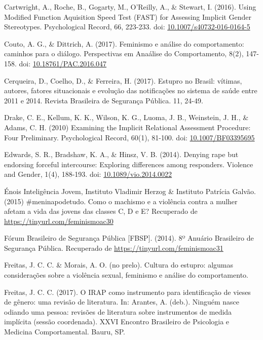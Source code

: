 \hangindent=25pt
\noindent Cartwright, A., Roche, B., Gogarty, M., O'Reilly, A., \& Stewart, I. (2016). Using Modified Function Aquisition Speed Test (FAST) for Assessing Implicit Gender Stereotypes. Psychological Record, 66, 223-233. doi: \url{10.1007/s40732-016-0164-5}

\hangindent=25pt
\noindent Couto, A. G., \& Dittrich, A. (2017). Feminismo e análise do comportamento: caminhos para o diálogo. Perspectivas em Anaálise do Comportamento, 8(2), 147-158. doi: \url{10.18761/PAC.2016.047}

\hangindent=25pt
\noindent Cerqueira, D., Coelho, D., \& Ferreira, H. (2017). Estupro no Brasil: vítimas, autores, fatores situacionais e evolução das notificações no sistema de saúde entre 2011 e 2014. Revista Brasileira de Segurança Pública. 11, 24-49. 

\hangindent=25pt
\noindent Drake, C. E., Kellum, K. K., Wilson, K. G., Luoma, J. B., Weinstein, J. H., \& Adams, C. H. (2010) Examining the Implicit Relational Assessment Procedure: Four Preliminary. Psychological Record, 60(1), 81-100. doi: \url{10.1007/BF03395695}

\hangindent=25pt
\noindent Edwards, S. R., Bradshaw, K. A., \& Hinsz, V. B. (2014). Denying rape but endorsing forceful intercourse: Exploring differences among responders. Violence and Gender, 1(4), 188-193. doi: \url{10.1089/vio.2014.0022}

\hangindent=25pt
\noindent Énois Inteligência Jovem, Instituto Vladimir Herzog \& Instituto Patrícia Galvão. (2015) \#meninapodetudo. Como o machismo e a violência contra a mulher afetam a vida das jovens das classes C, D e E? Recuperado de \url{https://tinyurl.com/feminismoac30} 

\hangindent=25pt
\noindent Fórum Brasileiro de Segurança Pública [FBSP]. (2014). 8º Anuário Brasileiro de Segurança Pública. Recuperado de \url{https://tinyurl.com/feminismoac31}

\hangindent=25pt
\noindent Freitas, J. C. C. \& Morais, A. O. (no prelo). Cultura do estupro: algumas considerações sobre a violência sexual, feminismo e análise do comportamento.

\hangindent=25pt
\noindent Freitas, J. C. C. (2017). O IRAP como instrumento para identificação de vieses de gênero: uma revisão de literatura. In: Arantes, A. (deb.). Ninguém nasce odiando uma pessoa: revisões de literatura sobre instrumentos de medida implícita (sessão coordenada). XXVI Encontro Brasileiro de Psicologia e Medicina Comportamental. Bauru, SP.

